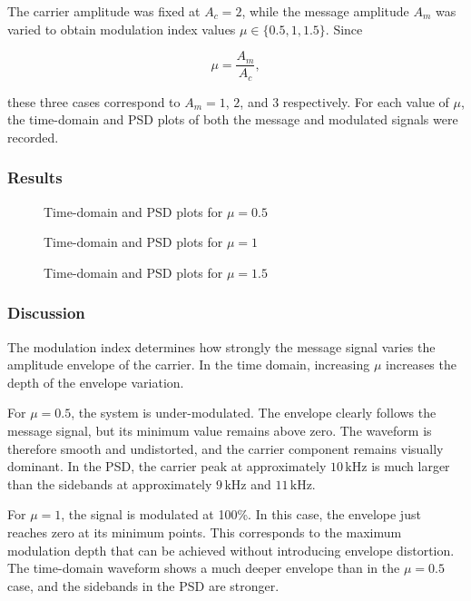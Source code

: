 \documentclass[../../main.tex]{subfiles}
\begin{document}
The carrier amplitude was fixed at $A_c=2$, while the message amplitude $A_m$ was varied to obtain modulation index values $\mu \in \{0.5, 1, 1.5\}$. Since

\[
\mu = \frac{A_m}{A_c},
\]

these three cases correspond to $A_m = 1$, $2$, and $3$ respectively. For each value of $\mu$, the time-domain and PSD plots of both the message and modulated signals were recorded.

\subsubsection*{Results}

\begin{figure}[htbp]
    \centering
    \caption{Time-domain and PSD plots for $\mu=0.5$}
\end{figure}

\begin{figure}[htbp]
    \centering
    \caption{Time-domain and PSD plots for $\mu=1$}
\end{figure}

\begin{figure}[htbp]
    \centering
    \caption{Time-domain and PSD plots for $\mu=1.5$}
\end{figure}

\FloatBarrier

\subsubsection*{Discussion}

The modulation index determines how strongly the message signal varies the amplitude envelope of the carrier. In the time domain, increasing $\mu$ increases the depth of the envelope variation.

For $\mu = 0.5$, the system is under-modulated. The envelope clearly follows the message signal, but its minimum value remains above zero. The waveform is therefore smooth and undistorted, and the carrier component remains visually dominant. In the PSD, the carrier peak at approximately $10\,\text{kHz}$ is much larger than the sidebands at approximately $9\,\text{kHz}$ and $11\,\text{kHz}$.

For $\mu = 1$, the signal is modulated at 100\%. In this case, the envelope just reaches zero at its minimum points. This corresponds to the maximum modulation depth that can be achieved without introducing envelope distortion. The time-domain waveform shows a much deeper envelope than in the $\mu=0.5$ case, and the sidebands in the PSD are stronger.
\end{document}
